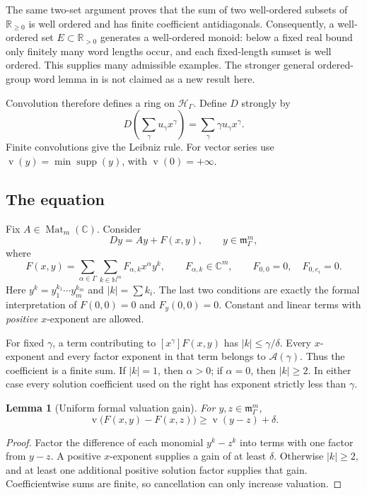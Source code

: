 \documentclass[11pt,a4paper]{article}
\numberwithin{equation}{section}
\newtheorem{lemma}[theorem]{Lemma}
\theoremstyle{definition}
\theoremstyle{remark}
\newcommand{\C}{\mathbb C}
\newcommand{\R}{\mathbb R}
\newcommand{\N}{\mathbb N}
\newcommand{\G}{\Gamma}
\newcommand{\HH}{\mathscr H}
\newcommand{\mm}{\mathfrak m}
\newcommand{\Anc}{\mathcal A}
\newcommand{\supp}{\operatorname{supp}}
\newcommand{\val}{\operatorname{v}}
\begin{document}
The same two-set argument proves that the sum of two well-ordered subsets
of $\R_{\geq0}$ is well ordered and has finite coefficient antidiagonals.
Consequently, a well-ordered set $E\subset\R_{>0}$ generates a well-ordered
monoid: below a fixed real bound only finitely many word lengths occur,
and each fixed-length sumset is well ordered. This supplies many admissible
examples. The stronger general ordered-group word lemma in
\cite{repo-words} is not claimed as a new result here.

Convolution therefore defines a ring on $\HH_\G$. Define $D$ strongly by
\begin{equation}\label{eq:D}
 D\!\left(\sum_\gamma u_\gamma x^\gamma\right)
   =\sum_\gamma\gamma u_\gamma x^\gamma.
\end{equation}
Finite convolutions give the Leibniz rule. For vector series use
$\val(y)=\min\supp(y)$, with $\val(0)=+\infty$.

\subsection{The equation}
Fix $A\in\operatorname{Mat}_m(\C)$. Consider
\begin{equation}\label{eq:system}
 Dy=Ay+F(x,y),\qquad y\in\mm_\G^m,
\end{equation}
where
\begin{equation}\label{eq:F}
 F(x,y)=\sum_{\alpha\in\G}\sum_{k\in\N^m}
                F_{\alpha,k}x^\alpha y^k,
 \qquad F_{\alpha,k}\in\C^m,
 \qquad F_{0,0}=0,\quad F_{0,e_i}=0.
\end{equation}
Here $y^k=y_1^{k_1}\cdots y_m^{k_m}$ and $|k|=\sum k_i$.
The last two conditions are exactly the formal interpretation of
$F(0,0)=0$ and $F_y(0,0)=0$. Constant and linear terms with \emph{positive}
$x$-exponent are allowed.

For fixed $\gamma$, a term contributing to $[x^\gamma]F(x,y)$ has
$|k|\leq\gamma/\delta$. Every $x$-exponent and every factor exponent in
that term belongs to $\Anc(\gamma)$. Thus the coefficient is a finite
sum. If $|k|=1$, then $\alpha>0$; if $\alpha=0$, then $|k|\geq2$.
In either case every solution coefficient used on the right has exponent
strictly less than $\gamma$.

\begin{lemma}[Uniform formal valuation gain]\label{lem:gain}
For $y,z\in\mm_\G^m$,
\begin{equation}\label{eq:gain}
 \val\bigl(F(x,y)-F(x,z)\bigr)\geq\val(y-z)+\delta.
\end{equation}
\end{lemma}
\begin{proof}
Factor the difference of each monomial $y^k-z^k$ into terms with one
factor from $y-z$. A positive $x$-exponent supplies a gain of at least
$\delta$. Otherwise $|k|\geq2$, and at least one additional positive
solution factor supplies that gain. Coefficientwise sums are finite, so
cancellation can only increase valuation.
\end{proof}
\end{document}
